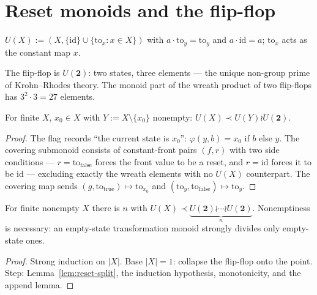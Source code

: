 \chapter{Reset monoids and the flip-flop}\label{ch:reset}

\begin{definition}\label{def:resets}
  \leanok
  $U(X) := (X, \{\mathrm{id}\} \cup \{\mathrm{to}_x : x \in X\})$ with
  $a \cdot \mathrm{to}_y = \mathrm{to}_y$ and $a \cdot \mathrm{id} = a$;
  $\mathrm{to}_x$ acts as the constant map $x$.
\end{definition}

\begin{definition}\label{def:flipflop}
  \leanok{}
  The flip-flop is $U(\mathbf{2})$: two states, three elements — the
  unique non-group prime of Krohn--Rhodes theory. The monoid part of
  the wreath product of two flip-flops has $3^2 \cdot 3 = 27$ elements.
\end{definition}

\begin{lemma}[Split]\label{lem:reset-split}
  \leanok
  For finite $X$, $x_0 \in X$ with $Y := X \setminus \{x_0\}$ nonempty:
  $U(X) \prec U(Y) \wr U(\mathbf 2)$.
\end{lemma}
\begin{proof}
  \leanok
  The flag records ``the current state is $x_0$'':
  $\varphi(y, b) = x_0$ if $b$ else $y$. The covering submonoid consists
  of constant-front pairs $(f, r)$ with two side conditions —
  $r = \mathrm{to}_{\mathrm{false}}$ forces the front value to be a
  reset, and $r = \mathrm{id}$ forces it to be $\mathrm{id}$ — excluding
  exactly the wreath elements with no $U(X)$ counterpart. The covering
  map sends $(g, \mathrm{to}_{\mathrm{true}}) \mapsto \mathrm{to}_{x_0}$
  and $(\mathrm{to}_y, \mathrm{to}_{\mathrm{false}}) \mapsto
  \mathrm{to}_y$.
\end{proof}

\begin{lemma}[DKS 2.12]\label{lem:reset-div-flipflops}
  \leanok
  For finite nonempty $X$ there is $n$ with
  $U(X) \prec \underbrace{U(\mathbf 2) \wr \cdots \wr
  U(\mathbf 2)}_{n}$.
  Nonemptiness is necessary: an empty-state transformation monoid
  strongly divides only empty-state ones.
\end{lemma}
\begin{proof}
  \leanok
  Strong induction on $|X|$. Base $|X| = 1$: collapse the flip-flop onto
  the point. Step: Lemma~\ref{lem:reset-split}, the induction
  hypothesis, monotonicity, and the append lemma.
\end{proof}
